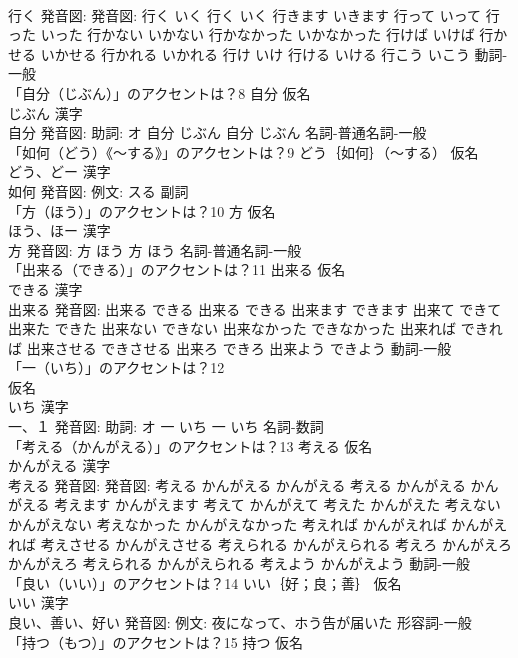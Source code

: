 \documentclass[8pt]{extreport}
\begin{document}
\begin{CJK}{UTF8}{min}
\\	行く 発音図: 発音図:	行く いく		行く いく 行きます いきます 行って いって 行った いった 行かない いかない 行かなかった いかなかった 行けば いけば 行かせる いかせる 行かれる いかれる 行け いけ 行ける いける 行こう いこう				動詞-一般 
\\	「自分（じぶん）」のアクセントは？8	自分 仮名　
\\	じぶん 漢字　
\\	自分 発音図: 助詞: オ	自分 じぶん		自分 じぶん				名詞-普通名詞-一般 
\\	「如何（どう）《〜する》」のアクセントは？9	どう｛如何｝（〜する） 仮名　
\\	どう、どー 漢字　
\\	如何 発音図: 例文: スる							副詞 
\\	「方（ほう）」のアクセントは？10	方 仮名　
\\	ほう、ほー 漢字　
\\	方 発音図:	方 ほう		方 ほう				名詞-普通名詞-一般 
\\	「出来る（できる）」のアクセントは？11	出来る 仮名　
\\	できる 漢字　
\\	出来る 発音図:	出来る できる		出来る できる 出来ます できます 出来て できて 出来た できた 出来ない できない 出来なかった できなかった 出来れば できれば 出来させる できさせる 出来ろ できろ 出来よう できよう				動詞-一般 
\\	「一（いち）」のアクセントは？12	
\\	仮名　
\\	いち 漢字　
\\	一、１ 発音図: 助詞: オ	一 いち		一 いち				名詞-数詞 
\\	「考える（かんがえる）」のアクセントは？13	考える 仮名　
\\	かんがえる 漢字　
\\	考える 発音図: 発音図:	考える かんがえる かんがえる		考える かんがえる かんがえる 考えます かんがえます 考えて かんがえて 考えた かんがえた 考えない かんがえない 考えなかった かんがえなかった 考えれば かんがえれば かんがえれば 考えさせる かんがえさせる 考えられる かんがえられる 考えろ かんがえろ かんがえろ 考えられる かんがえられる 考えよう かんがえよう				動詞-一般 
\\	「良い（いい）」のアクセントは？14	いい｛好；良；善｝ 仮名　
\\	いい 漢字　
\\	良い、善い、好い 発音図: 例文: 夜になって、ホう告が届いた							形容詞-一般 
\\	「持つ（もつ）」のアクセントは？15	持つ 仮名　

\end{CJK}
\end{document}
